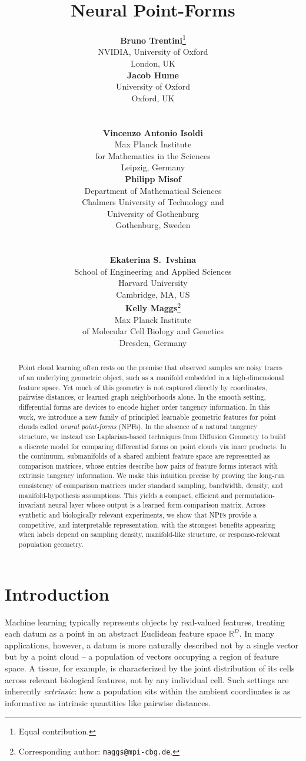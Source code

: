 \documentclass{article}
\title{Neural Point-Forms }
\author{%
  \begin{minipage}[t]{0.45\textwidth}
    \centering
    \textbf{Bruno Trentini}\thanks{Equal contribution.}\normalfont \\
    NVIDIA, University of Oxford \\
    London, UK
  \end{minipage}
  \begin{minipage}[t]{0.45\textwidth}
    \centering
    \textbf{Jacob Hume}\footnotemark[1] \normalfont \\
    University of Oxford \\
    Oxford, UK
  \end{minipage}
  \\[4em]
  \begin{minipage}[t]{0.45\textwidth}
    \centering
    \textbf{Vincenzo Antonio Isoldi} \\
    Max Planck Institute \\
    for Mathematics in the Sciences \\
    Leipzig, Germany
  \end{minipage}
  \begin{minipage}[t]{0.45\textwidth}
    \centering
    \textbf{Philipp Misof} \\
    Department of Mathematical Sciences \\
    Chalmers University of Technology and \\
    University of Gothenburg \\
    Gothenburg, Sweden
  \end{minipage}
  \\[6em]
  \begin{minipage}[t]{0.45\textwidth}
    \centering
    \textbf{Ekaterina S.~Ivshina} \\
    School of Engineering and Applied Sciences \\
    Harvard University \\
    Cambridge, MA, US
  \end{minipage}
  \begin{minipage}[t]{0.45\textwidth}
    \centering
    \textbf{Kelly Maggs}\thanks{Corresponding author: \texttt{maggs@mpi-cbg.de}.} \\
    Max Planck Institute \\
    of Molecular Cell Biology and Genetics \\
    Dresden, Germany
  \end{minipage}
}
\newcommand{\bruno}[1]{}
\newcommand{\jake}[1]{}
\newcommand{\kelly}[1]{}
\newcommand{\philipp}[1]{}
\newcommand{\katya}[1]{}
\newcommand{\vincenzo}[1]{}
\theoremstyle{remark}
\theoremstyle{plain}
\begin{document}
\maketitle

\begin{abstract}
Point cloud learning often rests on the premise that observed samples are noisy traces of an underlying geometric object, such as a manifold embedded in a high-dimensional feature space. Yet much of this geometry is not captured directly by coordinates, pairwise distances, or learned graph neighborhoods alone. In the smooth setting, differential forms are devices to encode higher order tangency information. In this work, we introduce a new family of principled learnable geometric features for point clouds called \textit{neural point-forms} (NPFs). In the absence of a natural tangency structure, we instead use Laplacian-based techniques from Diffusion Geometry to build a discrete model for comparing differential forms on point clouds via inner products. In the continuum, submanifolds of a shared ambient feature space are represented as comparison matrices, whose entries describe how pairs of feature forms interact with extrinsic tangency information. We make this intuition precise by proving the long-run consistency of comparison matrices under standard sampling, bandwidth, density, and manifold-hypothesis assumptions. This yields a compact, efficient and permutation-invariant neural layer whose output is a learned form-comparison matrix. Across synthetic and biologically relevant experiments, we show that NPFs provide a competitive, and interpretable representation, with the strongest benefits appearing when labels depend on sampling density, manifold-like structure, or response-relevant population geometry.


\end{abstract}




\section{Introduction}

Machine learning typically represents objects by real-valued features, treating each datum as a point in an abstract Euclidean feature space $\mathbb{R}^D$. In many applications, however, a datum is more naturally described not by a single vector but by a point cloud -- a population of vectors occupying a region of feature space. A tissue, for example, is characterized by the joint distribution of its cells across relevant biological features, not by any individual cell. Such settings are inherently \textit{extrinsic}: how a population sits within the ambient coordinates is as informative as intrinsic quantities like pairwise distances.
\end{document}
